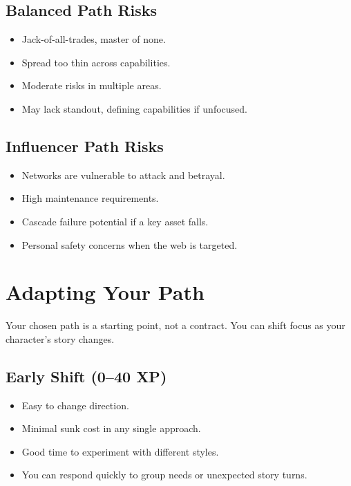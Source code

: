 \subsection*{Balanced Path Risks}
\begin{itemize}
\item Jack-of-all-trades, master of none.
\item Spread too thin across capabilities.
\item Moderate risks in multiple areas.
\item May lack standout, defining capabilities if unfocused.
\end{itemize}

\subsection*{Influencer Path Risks}
\begin{itemize}
\item Networks are vulnerable to attack and betrayal.
\item High maintenance requirements.
\item Cascade failure potential if a key asset falls.
\item Personal safety concerns when the web is targeted.
\end{itemize}


\section{Adapting Your Path}
\label{sec:xp-adapting}

Your chosen path is a starting point, not a contract. You can shift focus as
your character's story changes.

\subsection*{Early Shift (0--40 XP)}
\begin{itemize}
\item Easy to change direction.
\item Minimal sunk cost in any single approach.
\item Good time to experiment with different styles.
\item You can respond quickly to group needs or unexpected story turns.
\end{itemize}


